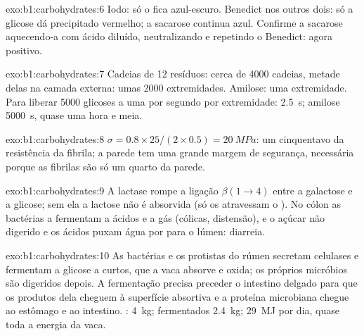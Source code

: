 \begin{solution}{exo:b1:carbohydrates:6}
Iodo: só o  fica azul-escuro. Benedict nos outros dois: só a
glicose dá precipitado vermelho; a sacarose continua azul. Confirme a
sacarose aquecendo-a com ácido diluído, neutralizando e repetindo o
Benedict: agora positivo.
\end{solution}

\begin{solution}{exo:b1:carbohydrates:7}
Cadeias de 12 resíduos: cerca de \num{4000} cadeias, metade delas na
camada externa: umas \num{2000} extremidades. Amilose: uma extremidade.
Para liberar \num{5000} glicoses a uma por segundo por extremidade:
 \qty{2.5}{s}; amilose \qty{5000}{s}, quase uma hora e meia.
\end{solution}

\begin{solution}{exo:b1:carbohydrates:8}
$\sigma = 0.8\times 25/(2\times 0.5) = \qty{20}{MPa}$: um cinquentavo da
resistência da fibrila; a parede tem uma grande margem de segurança,
necessária porque as fibrilas são só um quarto da parede.
\end{solution}

\begin{solution}{exo:b1:carbohydrates:9}
A lactase rompe a ligação $\beta(1{\to}4)$ entre a galactose e a
glicose; sem ela a lactose não é absorvida (só os 
atravessam o ). No cólon as bactérias a fermentam a ácidos e a
gás (cólicas, distensão), e o açúcar não digerido e os ácidos puxam água
por  para o lúmen: diarreia.
\end{solution}

\begin{solution}{exo:b1:carbohydrates:10}
As bactérias e os protistas do rúmen secretam celulases e fermentam a
glicose a  curtos, que a vaca absorve e oxida; os próprios
micróbios são digeridos depois. A fermentação precisa preceder o
intestino delgado para que os produtos dela cheguem à superfície
absortiva e a proteína microbiana chegue ao estômago e ao intestino.
: \qty{4}{kg}; fermentados \qty{2.4}{kg}; \qty{29}{MJ} por dia,
quase toda a energia da vaca.
\end{solution}

